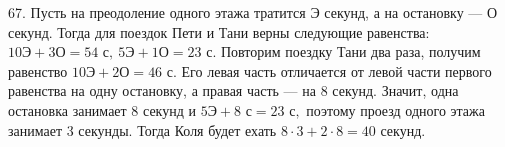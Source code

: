 67. Пусть на преодоление одного этажа тратится Э секунд, а на остановку --- О секунд. Тогда для поездок Пети и Тани верны следующие равенства: $10\text{Э}+3\text{О}=54\text{ с},\ 5\text{Э}+1\text{О}=23\text{ с}.$ Повторим поездку Тани два раза, получим равенство $10\text{Э}+2\text{О}=46\text{ с}.$ Его левая часть отличается от левой части первого равенства на одну остановку, а правая часть --- на 8 секунд. Значит, одна остановка занимает 8 секунд и
$5\text{Э}+8\text{ с}=23\text{ с},$ поэтому проезд одного этажа занимает 3 секунды. Тогда Коля будет ехать $8\cdot3+2\cdot8=40$ секунд.\\
